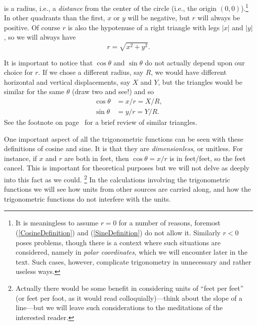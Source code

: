 is a radius, i.e., a {\it distance} from the 
center of the circle (i.e., the origin $(0,0)$).\footnote{%
It is meaningless to assume $r=0$ for
a number of reasons, foremost (\ref{CosineDefinition})
and (\ref{SineDefinition}) do not allow it.
Similarly $r<0$ poses problems, though there is a 
context where such situations are considered, namely
in {\it polar coordinates}, which we will encounter 
later in the text.  Such cases, however, 
complicate trigonometry in unnecessary and rather
useless ways.}
In other quadrants than the first, $x$ or $y$ will
be negative, but $r$ will always be positive.
Of course $r$ is also the hypotenuse of a right
triangle with legs $|x|$ and $|y|$, so 
we will always have 
\begin{equation}r=\sqrt{x^2+y^2}.\end{equation}

It is important to notice that $\cos\theta$ and $\sin\theta$
do not actually depend upon our choice for  $r$.
If we chose a different radius, say $R$, we would
have different horizontal and vertical displacements,
say $X$ and $Y$, but the triangles would be similar
for the same $\theta$ (draw two and see!) and so 
\begin{align*}
\cos\theta&=x/r=X/R,\\ \sin\theta&=y/r=Y/R.\end{align*}
See the footnote on page~\pageref{SimilarTrianglesPage}
for a brief review of similar triangles.

One important aspect of all the trigonometric functions
can be seen with these definitions of cosine and
sine.  It is that they are {\it dimensionless}, 
or unitless.  For instance, if $x$ and $r$ are 
both in feet, then $\cos\theta=x/r$ is in
feet/feet, so the feet cancel.  This is important
for theoretical purposes but we will not delve
as deeply into this fact as we could.%
\footnote{Actually there would be some benefit in
considering units of ``feet per feet'' (or
feet per foot, as it would read colloquially)---think
about the slope of a line---but we will leave such 
considerations to the meditations of the interested reader.}
In the calculations
involving the trigonometric functions we will see
how units from other sources
are carried along, and how the trigonometric
functions do not interfere with the units.



